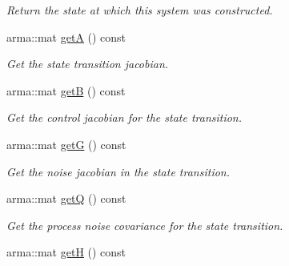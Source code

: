 \begin{DoxyCompactItemize}
\begin{DoxyCompactList}\small\item\em \-Return the state at which this system was constructed. \end{DoxyCompactList}\item 
\hypertarget{class_linear_system_aa9b7cdb3f9e09902fbe9b1d65d932edb}{arma\-::mat \hyperlink{class_linear_system_aa9b7cdb3f9e09902fbe9b1d65d932edb}{get\-A} () const }\label{class_linear_system_aa9b7cdb3f9e09902fbe9b1d65d932edb}

\begin{DoxyCompactList}\small\item\em \-Get the state transition jacobian. \end{DoxyCompactList}\item 
\hypertarget{class_linear_system_af1a0b99cb2b4e30eb61b1bee328fb0bd}{arma\-::mat \hyperlink{class_linear_system_af1a0b99cb2b4e30eb61b1bee328fb0bd}{get\-B} () const }\label{class_linear_system_af1a0b99cb2b4e30eb61b1bee328fb0bd}

\begin{DoxyCompactList}\small\item\em \-Get the control jacobian for the state transition. \end{DoxyCompactList}\item 
\hypertarget{class_linear_system_aaadd9d063ecdb4afb67ae4522cf921a7}{arma\-::mat \hyperlink{class_linear_system_aaadd9d063ecdb4afb67ae4522cf921a7}{get\-G} () const }\label{class_linear_system_aaadd9d063ecdb4afb67ae4522cf921a7}

\begin{DoxyCompactList}\small\item\em \-Get the noise jacobian in the state transition. \end{DoxyCompactList}\item 
\hypertarget{class_linear_system_ab95733398800308c2e69522d37f2a005}{arma\-::mat \hyperlink{class_linear_system_ab95733398800308c2e69522d37f2a005}{get\-Q} () const }\label{class_linear_system_ab95733398800308c2e69522d37f2a005}

\begin{DoxyCompactList}\small\item\em \-Get the process noise covariance for the state transition. \end{DoxyCompactList}\item 
\hypertarget{class_linear_system_a678fe164168013e7a4a4fc97e6716fa6}{arma\-::mat \hyperlink{class_linear_system_a678fe164168013e7a4a4fc97e6716fa6}{get\-H} () const }\label{class_linear_system_a678fe164168013e7a4a4fc97e6716fa6}


\end{DoxyCompactItemize}
